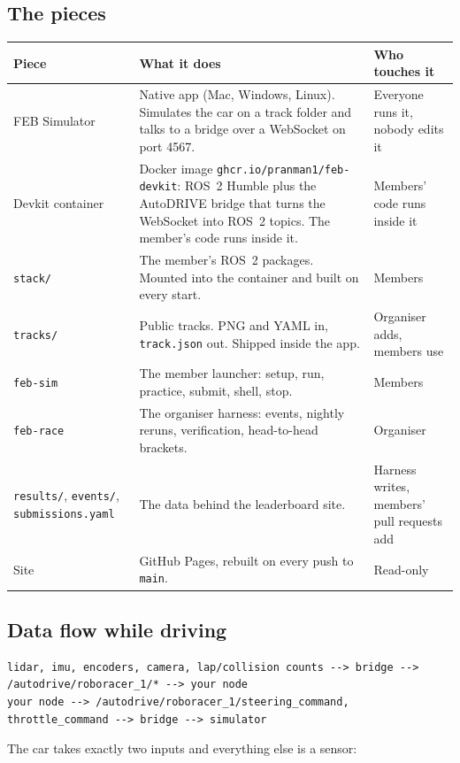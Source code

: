 \documentclass[11pt,a4paper]{article}
\newcommand{\file}[1]{\texttt{#1}}
\begin{document}
\subsection{The pieces}

\begin{tabularx}{\linewidth}{p{3.3cm}Xp{3.4cm}}
\toprule
Piece & What it does & Who touches it\\
\midrule
FEB Simulator & Native app (Mac, Windows, Linux). Simulates the car on a track folder and talks to a bridge over a WebSocket on port 4567. & Everyone runs it, nobody edits it\\
Devkit container & Docker image \file{ghcr.io/pranman1/feb-devkit}: ROS~2 Humble plus the AutoDRIVE bridge that turns the WebSocket into ROS~2 topics. The member's code runs inside it. & Members' code runs inside it\\
\file{stack/} & The member's ROS~2 packages. Mounted into the container and built on every start. & Members\\
\file{tracks/} & Public tracks. PNG and YAML in, \file{track.json} out. Shipped inside the app. & Organiser adds, members use\\
\file{feb-sim} & The member launcher: setup, run, practice, submit, shell, stop. & Members\\
\file{feb-race} & The organiser harness: events, nightly reruns, verification, head-to-head brackets. & Organiser\\
\file{results/}, \file{events/}, \file{submissions.yaml} & The data behind the leaderboard site. & Harness writes, members' pull requests add\\
Site & GitHub Pages, rebuilt on every push to \file{main}. & Read-only\\
\bottomrule
\end{tabularx}

\subsection{Data flow while driving}

\begin{lstlisting}
lidar, imu, encoders, camera, lap/collision counts --> bridge --> /autodrive/roboracer_1/* --> your node
your node --> /autodrive/roboracer_1/steering_command, throttle_command --> bridge --> simulator
\end{lstlisting}

The car takes exactly two inputs and everything else is a sensor:
\end{document}
